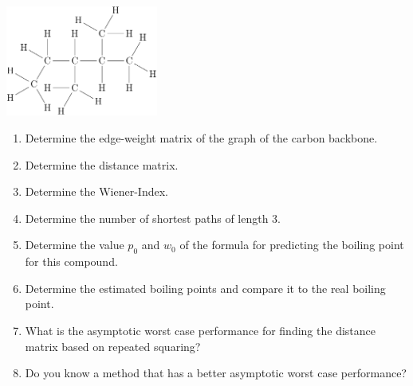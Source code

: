 \documentclass[10pt]{article}
\begin{document}
\includegraphics[width=5cm]{23dimethylpentan.pdf}

\begin{enumerate}
\item Determine the edge-weight matrix of the graph of the carbon backbone.
\item Determine the distance matrix.
\item Determine the Wiener-Index.
\item Determine the number of shortest paths of length 3.
\item Determine the value $p_0$ and $w_0$ of the formula for predicting the boiling point for this compound.
\item Determine the estimated boiling points and compare it to the real boiling point.
\item What is the asymptotic worst case performance for finding the distance matrix based on repeated squaring?
\item Do you know a method that has a better asymptotic worst case performance?
\end{enumerate}

\\
\end{document}
